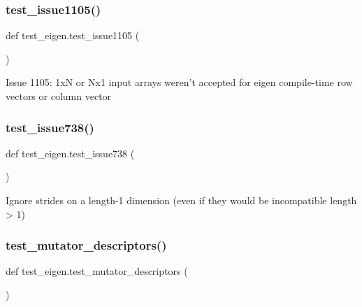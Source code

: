 \mbox{\label{namespacetest__eigen_a6ff4fd141b1b9756e18b7b04dd7f95f0}} 
\subsubsection{\texorpdfstring{test\_issue1105()}{test\_issue1105()}}
{\footnotesize\ttfamily def test\+\_\+eigen.\+test\+\_\+issue1105 (\begin{DoxyParamCaption}{ }\end{DoxyParamCaption})}

\begin{DoxyVerb}Issue 1105: 1xN or Nx1 input arrays weren't accepted for eigen
compile-time row vectors or column vector\end{DoxyVerb}
 \mbox{\label{namespacetest__eigen_a837393994e5023cb1b348a2da265ef0b}} 
\subsubsection{\texorpdfstring{test\_issue738()}{test\_issue738()}}
{\footnotesize\ttfamily def test\+\_\+eigen.\+test\+\_\+issue738 (\begin{DoxyParamCaption}{ }\end{DoxyParamCaption})}

\begin{DoxyVerb}Ignore strides on a length-1 dimension (even if they would be incompatible length > 1)\end{DoxyVerb}
 \mbox{\label{namespacetest__eigen_a8658a543f18242bc0143a45a161f3b81}} 
\subsubsection{\texorpdfstring{test\_mutator\_descriptors()}{test\_mutator\_descriptors()}}
{\footnotesize\ttfamily def test\+\_\+eigen.\+test\+\_\+mutator\+\_\+descriptors (\begin{DoxyParamCaption}{ }\end{DoxyParamCaption})}

